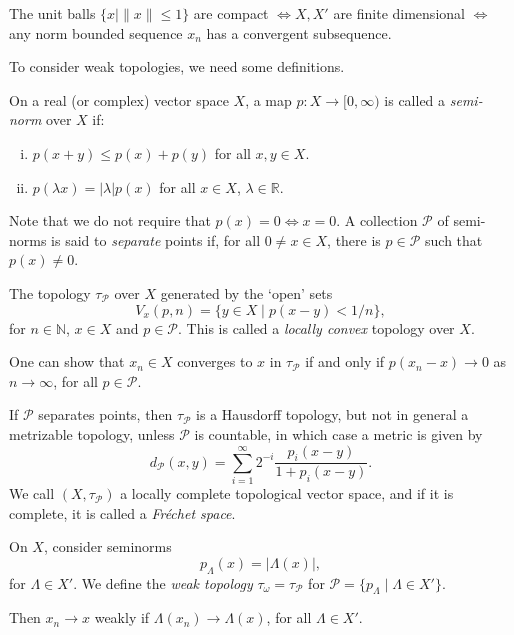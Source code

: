 \documentclass[12pt]{article}
\begin{document}
The unit balls $\{x \mid \|x\| \leq 1\}$ are compact $\iff X, X'$ are finite dimensional $\iff$ any norm bounded sequence $x_n$ has a convergent subsequence.

To consider weak topologies, we need some definitions.

\begin{definition}
	On a real (or complex) vector space $X$, a map $p : X \to [0, \infty)$ is called a \emph{semi-norm} over $X$ if:
	\begin{enumerate}[(i)]
		\item $p(x + y) \leq p(x) + p(y)$ for all $x, y \in X$.
		\item $p(\lambda x) = |\lambda| p(x)$ for all $x \in X$, $\lambda \in \mathbb{R}$.
	\end{enumerate}
	Note that we do not require that $p(x) = 0 \iff x = 0$. A collection $\mathcal{P}$ of semi-norms is said to \emph{separate} points if, for all $0 \neq x \in X$, there is $p \in \mathcal{P}$ such that $p(x) \neq 0$.

	The topology $\tau_{\mathcal{P}}$ over $X$ generated by the `open' sets
	\[
		V_x(p, n) = \{y \in X \mid p(x - y) < 1/n \},
	\]
	for $n \in \mathbb{N}$, $x \in X$ and $p \in \mathcal{P}$. This is called a \emph{locally convex} topology over $X$.
\end{definition}

One can show that $x_n \in X$ converges to $x$ in $\tau_{\mathcal{P}}$ if and only if $p(x_n - x) \to 0$ as $n \to \infty$, for all $p \in \mathcal{P}$.

If $\mathcal{P}$ separates points, then $\tau_{\mathcal{P}}$ is a Hausdorff topology, but not in general a metrizable topology, unless $\mathcal{P}$ is countable, in which case a metric is given by
\[
d_{\mathcal{P}}(x, y) = \sum_{i = 1}^\infty 2^{-i} \frac{p_i(x - y)}{1 + p_i(x - y)}.
\]
We call $(X, \tau_{\mathcal{P}})$ a locally complete topological vector space, and if it is complete, it is called a \emph{Fr\'echet space}.

\begin{exbox}
	On $X$, consider seminorms
	\[
	p_\Lambda(x) = |\Lambda(x)|,
	\]
	for $\Lambda \in X'$. We define the \emph{weak topology} $\tau_\omega = \tau_{\mathcal{P}}$ for $\mathcal{P} = \{p_\Lambda \mid \Lambda \in X'\}$.

	Then $x_n \to x$ weakly if $\Lambda(x_n) \to \Lambda(x)$, for all $\Lambda \in X'$.
\end{exbox}
\end{document}
